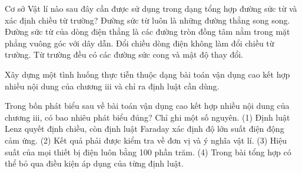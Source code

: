 \begin{ex}
Cơ sở Vật lí nào sau đây cần được sử dụng trong dạng tổng hợp đường sức từ và xác định chiều từ trường?
\choice
{Đường sức từ luôn là những đường thẳng song song.}
{\True Đường sức từ của dòng điện thẳng là các đường tròn đồng tâm nằm trong mặt phẳng vuông góc với dây dẫn.}
{Đổi chiều dòng điện không làm đổi chiều từ trường.}
{Từ trường đều có các đường sức cong và mật độ thay đổi.}
\end{ex}

\begin{bt}
Xây dựng một tình huống thực tiễn thuộc dạng bài toán vận dụng cao kết hợp nhiều nội dung của chương iii và chỉ ra định luật cần dùng.
\end{bt}

\begin{ex}
Trong bốn phát biểu sau về bài toán vận dụng cao kết hợp nhiều nội dung của chương iii, có bao nhiêu phát biểu đúng? Chỉ ghi một số nguyên. (1) Định luật Lenz quyết định chiều, còn định luật Faraday xác định độ lớn suất điện động cảm ứng. (2) Kết quả phải được kiểm tra về đơn vị và ý nghĩa vật lí. (3) Hiệu suất của mọi thiết bị điện luôn bằng 100 phần trăm. (4) Trong bài tổng hợp có thể bỏ qua điều kiện áp dụng của từng định luật.
\end{ex}

